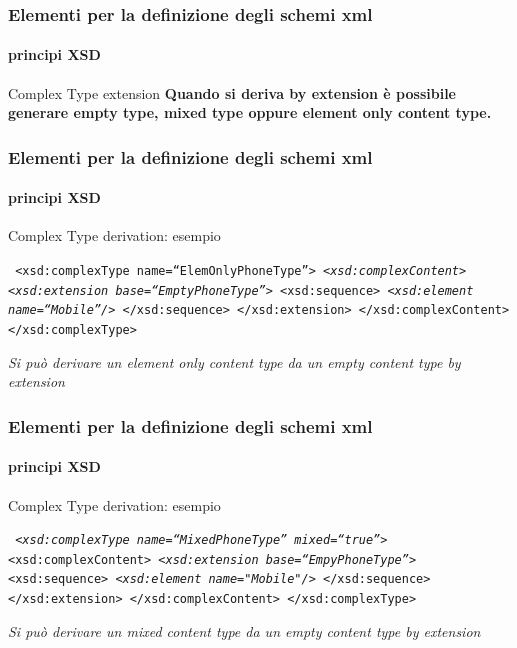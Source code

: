 

\begin{frame}
	\frametitle{Elementi per la definizione degli schemi xml}
	\framesubtitle{principi XSD}
	\addtocounter{nframe}{1}

	\begin{block}{Complex Type extension}
		\textbf{Quando si deriva by extension è possibile generare empty type, mixed type oppure element only content type.}
	\end{block}

\end{frame}


\begin{frame}
	\frametitle{Elementi per la definizione degli schemi xml}
	\framesubtitle{principi XSD}
	\addtocounter{nframe}{1}

	\begin{block}{Complex Type derivation: esempio}

		\texttt{
			<xsd:complexType name=``ElemOnlyPhoneType''>
			\emph{<xsd:complexContent>}
			\emph{<xsd:extension base=``EmptyPhoneType''>}
			<xsd:sequence>
			\emph{<xsd:element name=``Mobile''/>}
			</xsd:sequence>
			</xsd:extension>
			</xsd:complexContent>
			</xsd:complexType>
		}
	\end{block}
	\textit{Si può derivare un element only content type da un empty content type by extension}
\end{frame}


\begin{frame}
	\frametitle{Elementi per la definizione degli schemi xml}
	\framesubtitle{principi XSD}
	\addtocounter{nframe}{1}

	\begin{block}{Complex Type derivation: esempio}

		\texttt{
			\emph{<xsd:complexType name=``MixedPhoneType'' mixed=``true''>}
			<xsd:complexContent>
			\emph{<xsd:extension base=``EmpyPhoneType''>}
			<xsd:sequence>
			\emph{<xsd:element name="Mobile"/>}
			</xsd:sequence>
			</xsd:extension>
			</xsd:complexContent>
			</xsd:complexType>
		}
	\end{block}
	\textit{Si può derivare un mixed content type da un empty content type by extension}
\end{frame}

